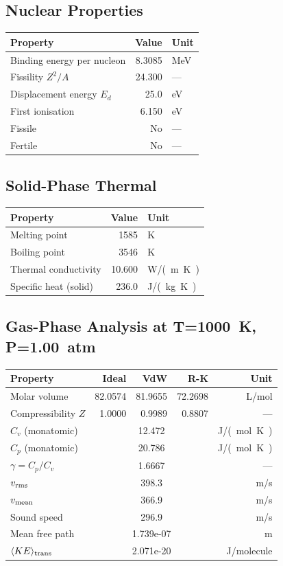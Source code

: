\documentclass[11pt,a4paper]{article}
\begin{document}
\subsection{Nuclear Properties}
\begin{tabular}{lrl}
  \toprule
  Property & Value & Unit \\
  \midrule
  Binding energy per nucleon & 8.3085 & \si{MeV} \\
  Fissility $Z^2/A$ & 24.300 & --- \\
  Displacement energy $E_d$ & 25.0 & \si{eV} \\
  First ionisation & 6.150 & \si{eV} \\
  Fissile & No & --- \\
  Fertile & No & --- \\
  \bottomrule
\end{tabular}

\subsection{Solid-Phase Thermal}
\begin{tabular}{lrl}
  \toprule
  Property & Value & Unit \\
  \midrule
  Melting point & 1585 & \si{K} \\
  Boiling point & 3546 & \si{K} \\
  Thermal conductivity & 10.600 & \si{W/(m.K)} \\
  Specific heat (solid) & 236.0 & \si{J/(kg.K)} \\
  \bottomrule
\end{tabular}

\subsection{Gas-Phase Analysis at T=\SI{1000}{K}, P=\SI{1.00}{atm}}
\begin{tabular}{lrrrr}
  \toprule
  Property & Ideal & VdW & R-K & Unit \\
  \midrule
  Molar volume & 82.0574 & 81.9655 & 72.2698 & \si{L/mol} \\
  Compressibility $Z$ & 1.0000 & 0.9989 & 0.8807 & --- \\
  \midrule
  $C_v$ (monatomic) & \multicolumn{3}{c}{12.472} & \si{J/(mol.K)} \\
  $C_p$ (monatomic) & \multicolumn{3}{c}{20.786} & \si{J/(mol.K)} \\
  $\gamma = C_p/C_v$ & \multicolumn{3}{c}{1.6667} & --- \\
  $v_{\rm rms}$ & \multicolumn{3}{c}{398.3} & \si{m/s} \\
  $v_{\rm mean}$ & \multicolumn{3}{c}{366.9} & \si{m/s} \\
  Sound speed & \multicolumn{3}{c}{296.9} & \si{m/s} \\
  Mean free path & \multicolumn{3}{c}{1.739e-07} & \si{m} \\
  $\langle KE \rangle_{\rm trans}$ & \multicolumn{3}{c}{2.071e-20} & \si{J/molecule} \\
  \bottomrule
\end{tabular}
\end{document}
